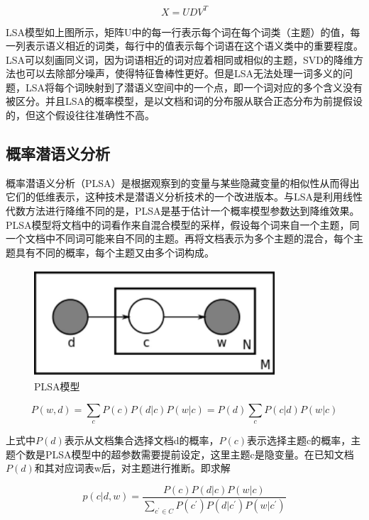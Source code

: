 \documentclass[winfonts,master,oneside,nobackinfo]{njuthesis}
\begin{document}
$$X = U D V ^ { T }$$

LSA模型如上图所示，矩阵U中的每一行表示每个词在每个词类（主题）的值，每一列表示语义相近的词类，每行中的值表示每个词语在这个语义类中的重要程度。LSA可以刻画同义词，因为词语相近的词对应着相同或相似的主题，SVD的降维方法也可以去除部分噪声，使得特征鲁棒性更好。但是LSA无法处理一词多义的问题，LSA将每个词映射到了潜语义空间中的一个点，即一个词对应的多个含义没有被区分。并且LSA的概率模型，是以文档和词的分布服从联合正态分布为前提假设的，但这个假设往往准确性不高。

\subsection{概率潜语义分析}

概率潜语义分析（PLSA）是根据观察到的变量与某些隐藏变量的相似性从而得出它们的低维表示，这种技术是潜语义分析技术的一个改进版本。与LSA是利用线性代数方法进行降维不同的是，PLSA是基于估计一个概率模型参数达到降维效果。PLSA模型将文档中的词看作来自混合模型的采样，假设每个词来自一个主题，同一个文档中不同词可能来自不同的主题。再将文档表示为多个主题的混合，每个主题具有不同的概率，每个主题又由多个词构成。

\begin{figure}[h]
\centering
\begin{minipage}[t]{\textwidth}
\includegraphics[width=0.8\textwidth,height=4.0cm]{./figure/PLSA.jpg}
\caption{PLSA模型}
\label{lab:1}
\end{minipage}
\end{figure}

$$P ( w , d ) = \sum _ { c } P ( c ) P ( d | c ) P ( w | c ) = P ( d ) \sum _ { c } P ( c | d ) P ( w | c )$$

上式中$P ( d )$表示从文档集合选择文档d的概率，$P ( c )$表示选择主题c的概率，主题个数是PLSA模型中的超参数需要提前设定，这里主题c是隐变量。在已知文档$P ( d )$和其对应词表w后，对主题进行推断。即求解

$$p ( c | d , w ) = \frac { P ( c ) P ( d | c ) P ( w | c ) } { \sum _ { c ^ { \prime } \in C } P \left( c ^ { \prime } \right) P ( d | c ^ { \prime } ) P ( w | c ^ { \prime } ) }$$
\end{document}
